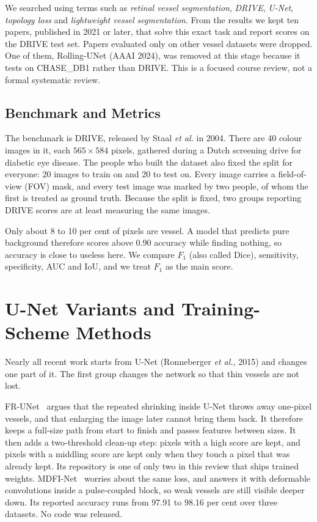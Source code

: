 \documentclass[conference]{IEEEtran}
\begin{document}
We searched using terms such as \textit{retinal vessel segmentation},
\textit{DRIVE}, \textit{U-Net}, \textit{topology loss} and \textit{lightweight
vessel segmentation}. From the results we kept ten papers, published in 2021 or
later, that solve this exact task and report scores on the DRIVE test set.
Papers evaluated only on other vessel datasets were dropped. One of them,
Rolling-UNet (AAAI 2024), was removed at this stage because it tests on
CHASE\_DB1 rather than DRIVE. This is a focused course review, not a formal
systematic review.

\subsection{Benchmark and Metrics}

The benchmark is DRIVE, released by Staal \textit{et al.} in 2004. There are 40
colour images in it, each $565 \times 584$ pixels, gathered during a Dutch
screening drive for diabetic eye disease. The people who built the dataset also
fixed the split for everyone: 20 images to train on and 20 to test on. Every
image carries a field-of-view (FOV) mask, and every test image was marked by
two people, of whom the first is treated as ground truth. Because the split is
fixed, two groups reporting DRIVE scores are at least measuring the same
images.

Only about 8 to 10 per cent of pixels are vessel. A model that predicts pure
background therefore scores above 0.90 accuracy while finding nothing, so
accuracy is close to useless here. We compare $F_1$ (also called Dice),
sensitivity, specificity, AUC and IoU, and we treat $F_1$ as the main score.

\section{U-Net Variants and Training-Scheme Methods}

Nearly all recent work starts from U-Net (Ronneberger \textit{et al.}, 2015)
and changes one part of it. The first group changes the network so that thin
vessels are not lost.

FR-UNet~\cite{frunet} argues that the repeated shrinking inside U-Net throws
away one-pixel vessels, and that enlarging the image later cannot bring them
back. It therefore keeps a full-size path from start to finish and passes
features between sizes. It then adds a two-threshold clean-up step: pixels with
a high score are kept, and pixels with a middling score are kept only when they
touch a pixel that was already kept. Its repository is one of only two in this
review that ships trained weights. MDFI-Net~\cite{mdfinet} worries about the
same loss, and answers it with deformable convolutions inside a pulse-coupled
block, so weak vessels are still visible deeper down. Its reported accuracy
runs from 97.91 to 98.16 per cent over three datasets. No code was released.
\end{document}
